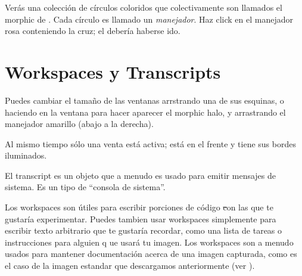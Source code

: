 \documentclass[a4paper,10pt,twoside]{book}
\begin{document}
Ver\'as una colecci\'on de c\'irculos coloridos que colectivamente son llamados el morphic  de \bam.
Cada c\'irculo es llamado un \emph{manejador}.
Haz click en el manejador rosa conteniendo la cruz; el \bam deber\'ia haberse ido. 

\section{Workspaces y Transcripts}


Puedes cambiar el tamaño de las ventanas arrstrando una de sus esquinas, o haciendo \metaclick en la ventana para hacer aparecer el morphic halo, y arrastrando el manejador amarillo (abajo a la derecha).

Al mismo tiempo s\'olo una venta est\'a activa; est\'a en el frente y tiene sus bordes iluminados.

El transcript es un objeto que a menudo es usado para emitir mensajes de sistema.
Es un tipo de ``consola de sistema''.

Los workspaces son \'utiles para escribir porciones de c\'odigo \st con las que te gustar\'ia experimentar.
Puedes tambien usar workspaces simplemente para escribir texto arbitrario que te gustar\'ia recordar, como una lista de tareas o instrucciones para alguien q ue usar\'a tu imagen.
Los workspaces son a menudo usados para mantener documentaci\'on acerca de una imagen capturada, como es el caso de la imagen estandar que descargamos anteriormente (ver ).
\end{document}
